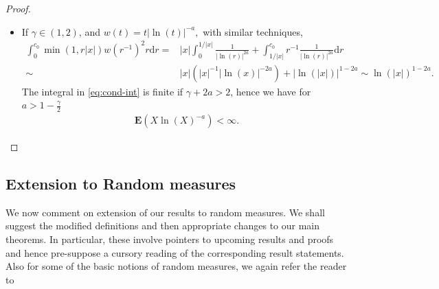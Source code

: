 \documentclass[12pt]{article}
\newcommand{\1}{\mathbf{1}}
\newcommand{\md}{\mathrm{d}}
\renewcommand{\footnote}[1]{}
\begin{document}
{{{{{\begin{proof}
\begin{itemize}
\item If $ \gamma \in (1,2)$, and $ w(t) = t | \ln(t) | ^{-a},$ with similar techniques,
\begin{align*}
 \int_{0}^{c_{0}}\min( 1,r | x | )w(r^{- 1})^{2}r\md r = & | x | \int_{0}^{ 1/ | x | }\frac{  1}{ | \ln(r) | ^{2a}} + \int_{ 1/ | x | }^{c_{0}}r^{- 1}  \frac{ 1}{  | \ln(r) | ^{2a}}\md r   \\
 \sim  & | x | (  | x | ^{- 1} | \ln(x) | ^{-2a}) +  | \ln( | x | ) | ^{ 1-2a} \sim  \ln(  | x | )^{ 1-2a}.
\end{align*}
The integral in \eqref{eq:cond-int}   is finite if $ \gamma  + 2a> 2$, hence we have for $ a> 1-\frac{  \gamma }{2}$
\begin{align*}\mathbf{E}(X \ln(X)^{- a})<\infty .
\end{align*}
%
\end{itemize}

\end{proof}
}

\subsection{Extension to Random measures}
\label{sec:extensionrm}

{We now comment on extension of our results to random measures. We shall suggest the modified definitions and then appropriate changes to our main theorems. In particular, these involve pointers to upcoming results and proofs and hence pre-suppose a cursory reading of the corresponding result statements.} Also for some of the basic notions of random measures, we again refer the reader to \cite{baccelli2020random,kallenberg2017random,last2017lectures}

}}}}
\end{document}
